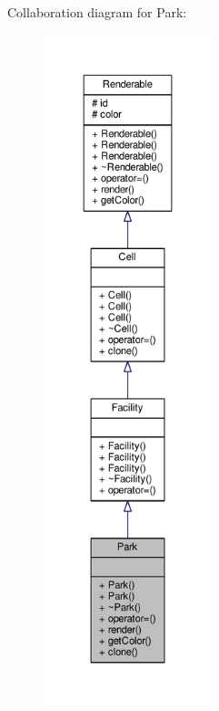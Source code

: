 Collaboration diagram for Park\+:
\nopagebreak
\begin{figure}[H]
\begin{center}
\leavevmode
\includegraphics[height=550pt]{classPark__coll__graph}
\end{center}
\end{figure}
